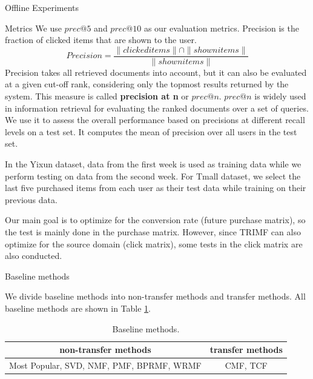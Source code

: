\begin{section}{Offline Experiments}
\begin{subsection}{Metrics}
We use $prec@5$ and $prec@10$ as our evaluation metrics. Precision is the fraction of clicked items that are shown to the user. $$Precision = \frac{\|clicked items\| \cap \|shown items\|}{\|shown items\|}$$Precision takes all retrieved documents into account, but it can also be evaluated at a given cut-off rank, considering only the topmost results returned by the system. This measure is called \textbf{precision at n} or \textbf{$prec@n$}. $prec@n$ is widely used in information retrieval for evaluating the ranked documents over a set of queries. We use it to assess the overall performance based on precisions at different recall levels on a test set. It computes the mean of precision over all users in the test set. 

In the Yixun dataset, data from the first week is used as training data while we perform testing on data from the second week. For Tmall dataset, we select the last five purchased items from each user as their test data while training on their previous data.

Our main goal is to optimize for the conversion rate (future purchase matrix), so the test is mainly done in the purchase matrix. However, since TRIMF can also optimize for the source domain (click matrix), some tests in the click matrix are also conducted.

  
\end{subsection}

\begin{subsection}{Baseline methods}  

We divide baseline methods into non-transfer methods and transfer methods. All baseline methods are shown in Table \ref{baseline}.
\begin{table}

\begin{center}
  \begin{tabular}{|c|c|}
    \hline
    non-transfer methods & transfer methods\\
    \hline
    Most Popular, SVD, NMF, PMF, BPRMF, WRMF&CMF, TCF\\
\hline
  \end{tabular}
\end{center}
\caption{Baseline methods.}
\label{baseline}


\end{table}

\end{subsection}
\end{section}
